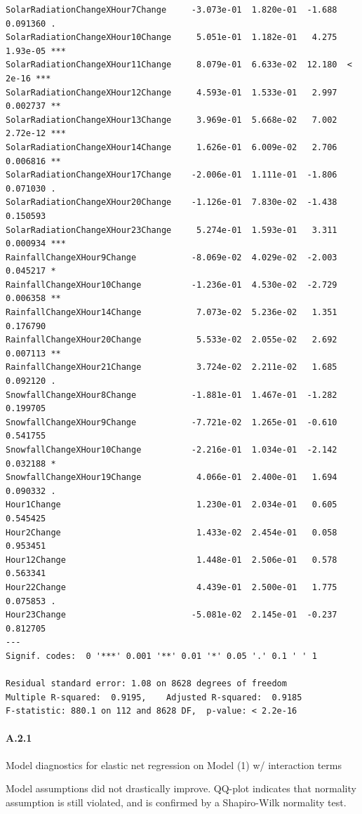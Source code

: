 \documentclass[
  letterpaper,
  DIV=11,
  numbers=noendperiod]{scrartcl}
\let\oldparagraph\paragraph
\renewcommand{\paragraph}[1]{\oldparagraph{#1}\mbox{}}
\begin{document}
\begin{verbatim}
SolarRadiationChangeXHour7Change     -3.073e-01  1.820e-01  -1.688 0.091360 .  
SolarRadiationChangeXHour10Change     5.051e-01  1.182e-01   4.275 1.93e-05 ***
SolarRadiationChangeXHour11Change     8.079e-01  6.633e-02  12.180  < 2e-16 ***
SolarRadiationChangeXHour12Change     4.593e-01  1.533e-01   2.997 0.002737 ** 
SolarRadiationChangeXHour13Change     3.969e-01  5.668e-02   7.002 2.72e-12 ***
SolarRadiationChangeXHour14Change     1.626e-01  6.009e-02   2.706 0.006816 ** 
SolarRadiationChangeXHour17Change    -2.006e-01  1.111e-01  -1.806 0.071030 .  
SolarRadiationChangeXHour20Change    -1.126e-01  7.830e-02  -1.438 0.150593    
SolarRadiationChangeXHour23Change     5.274e-01  1.593e-01   3.311 0.000934 ***
RainfallChangeXHour9Change           -8.069e-02  4.029e-02  -2.003 0.045217 *  
RainfallChangeXHour10Change          -1.236e-01  4.530e-02  -2.729 0.006358 ** 
RainfallChangeXHour14Change           7.073e-02  5.236e-02   1.351 0.176790    
RainfallChangeXHour20Change           5.533e-02  2.055e-02   2.692 0.007113 ** 
RainfallChangeXHour21Change           3.724e-02  2.211e-02   1.685 0.092120 .  
SnowfallChangeXHour8Change           -1.881e-01  1.467e-01  -1.282 0.199705    
SnowfallChangeXHour9Change           -7.721e-02  1.265e-01  -0.610 0.541755    
SnowfallChangeXHour10Change          -2.216e-01  1.034e-01  -2.142 0.032188 *  
SnowfallChangeXHour19Change           4.066e-01  2.400e-01   1.694 0.090332 .  
Hour1Change                           1.230e-01  2.034e-01   0.605 0.545425    
Hour2Change                           1.433e-02  2.454e-01   0.058 0.953451    
Hour12Change                          1.448e-01  2.506e-01   0.578 0.563341    
Hour22Change                          4.439e-01  2.500e-01   1.775 0.075853 .  
Hour23Change                         -5.081e-02  2.145e-01  -0.237 0.812705    
---
Signif. codes:  0 '***' 0.001 '**' 0.01 '*' 0.05 '.' 0.1 ' ' 1

Residual standard error: 1.08 on 8628 degrees of freedom
Multiple R-squared:  0.9195,    Adjusted R-squared:  0.9185 
F-statistic: 880.1 on 112 and 8628 DF,  p-value: < 2.2e-16
\end{verbatim}

\hypertarget{a21}{%
\paragraph{A.2.1}\label{a21}}

Model diagnostics for elastic net regression on Model (1) w/ interaction
terms

Model assumptions did not drastically improve. QQ-plot indicates that
normality assumption is still violated, and is confirmed by a
Shapiro-Wilk normality test.
\end{document}
